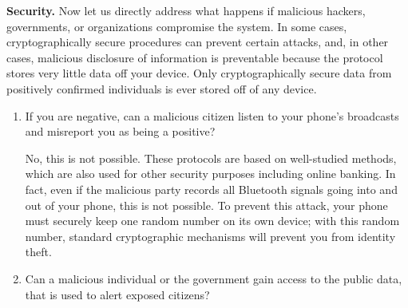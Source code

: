 \documentclass{article}
\begin{document}
\textbf{Security.} Now let us directly address what happens if malicious hackers, governments, or organizations compromise the system. In some cases, cryptographically secure procedures can prevent certain attacks, and, in other cases, malicious disclosure of information is preventable because the protocol stores very little data off your device. Only cryptographically secure data from positively confirmed individuals is ever stored off of any device.

\begin{enumerate}[leftmargin=*]

\item If you are negative, can a malicious citizen listen to your phone's broadcasts and misreport you as being a positive?

   No, this is not possible. These protocols are based on well-studied methods, which are also used for other security purposes including online banking. In fact, even if the malicious party records all Bluetooth signals going into and out of your phone, this is not possible.   To prevent this attack, your phone must securely keep one random number on its own device; with this random number, standard cryptographic mechanisms will prevent you from identity theft. 
   
   \iffalse 
   Again, recall that since you have not reported as being positive, then no information of yours will leave your phone\footnote{Technically, the Bluetooth protocol used is one where random signals are sent from your phone. However, these signals are random and reveal no information about any information on your phone, under standard  cryptographic assumptions.}.
   \fi
   
\iffalse
These protocols are based on well-studied methods, which are also used for other security purposes including online banking. In fact, even if the malicious party records all Bluetooth signals going into and out of your phone, this is not possible.  
To prevent this attack, your phone must securely keep one random number on its own device; with this random number, standard cryptographic mechanisms will prevent you from identity theft. 
\fi

\iffalse
\item Can a malicious individual or the government gain access to the public data, that is used to alert exposed citizens? 


\end{enumerate}
\end{document}
